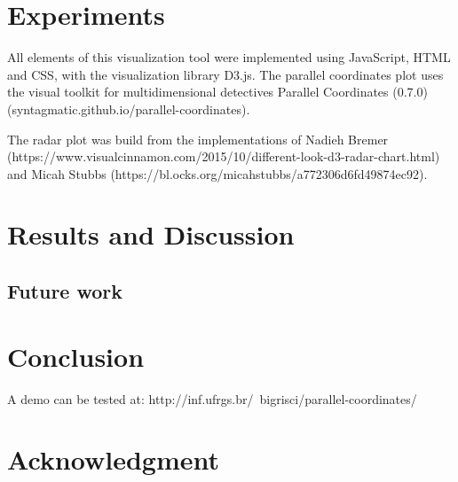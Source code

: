 \documentclass[10pt, conference]{IEEEtran}
\begin{document}
\section{Experiments}
%

All elements of this visualization tool were implemented using JavaScript, HTML and CSS, with the visualization library D3.js. The parallel coordinates plot uses the visual toolkit for multidimensional detectives Parallel Coordinates (0.7.0) (syntagmatic.github.io/parallel-coordinates). 

The radar plot was build from the implementations of Nadieh Bremer (https://www.visualcinnamon.com/2015/10/different-look-d3-radar-chart.html) and Micah Stubbs (https://bl.ocks.org/micahstubbs/a772306d6fd49874ec92). 

\section{Results and Discussion}
%

%


\subsection{Future work}
%


\section{Conclusion}
%
A demo can be tested at: http://inf.ufrgs.br/~bigrisci/parallel-coordinates/


\iffinal
\section*{Acknowledgment}
%

\fi







\end{document}
